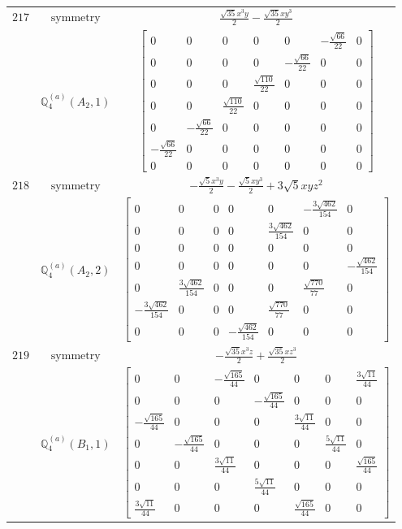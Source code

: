 \documentclass[fleqn,8pt,landscape]{jsarticle}
\begin{document}
\begin{longtable}{ccc}
$ 217 $ & $ \text{symmetry} $ & $ \frac{\sqrt{35} x^{3} y}{2} - \frac{\sqrt{35} x y^{3}}{2} $ \\
$  $ & $ \mathbb{Q}_{4}^{(a)}(A_{2},1) $ & $ \begin{bmatrix} 0 & 0 & 0 & 0 & 0 & - \frac{\sqrt{66}}{22} & 0 \\ 0 & 0 & 0 & 0 & - \frac{\sqrt{66}}{22} & 0 & 0 \\ 0 & 0 & 0 & \frac{\sqrt{110}}{22} & 0 & 0 & 0 \\ 0 & 0 & \frac{\sqrt{110}}{22} & 0 & 0 & 0 & 0 \\ 0 & - \frac{\sqrt{66}}{22} & 0 & 0 & 0 & 0 & 0 \\ - \frac{\sqrt{66}}{22} & 0 & 0 & 0 & 0 & 0 & 0 \\ 0 & 0 & 0 & 0 & 0 & 0 & 0 \end{bmatrix} $ \\ \hline
$ 218 $ & $ \text{symmetry} $ & $ - \frac{\sqrt{5} x^{3} y}{2} - \frac{\sqrt{5} x y^{3}}{2} + 3 \sqrt{5} x y z^{2} $ \\
$  $ & $ \mathbb{Q}_{4}^{(a)}(A_{2},2) $ & $ \begin{bmatrix} 0 & 0 & 0 & 0 & 0 & - \frac{3 \sqrt{462}}{154} & 0 \\ 0 & 0 & 0 & 0 & \frac{3 \sqrt{462}}{154} & 0 & 0 \\ 0 & 0 & 0 & 0 & 0 & 0 & 0 \\ 0 & 0 & 0 & 0 & 0 & 0 & - \frac{\sqrt{462}}{154} \\ 0 & \frac{3 \sqrt{462}}{154} & 0 & 0 & 0 & \frac{\sqrt{770}}{77} & 0 \\ - \frac{3 \sqrt{462}}{154} & 0 & 0 & 0 & \frac{\sqrt{770}}{77} & 0 & 0 \\ 0 & 0 & 0 & - \frac{\sqrt{462}}{154} & 0 & 0 & 0 \end{bmatrix} $ \\ \hline
$ 219 $ & $ \text{symmetry} $ & $ - \frac{\sqrt{35} x^{3} z}{2} + \frac{\sqrt{35} x z^{3}}{2} $ \\
$  $ & $ \mathbb{Q}_{4}^{(a)}(B_{1},1) $ & $ \begin{bmatrix} 0 & 0 & - \frac{\sqrt{165}}{44} & 0 & 0 & 0 & \frac{3 \sqrt{11}}{44} \\ 0 & 0 & 0 & - \frac{\sqrt{165}}{44} & 0 & 0 & 0 \\ - \frac{\sqrt{165}}{44} & 0 & 0 & 0 & \frac{3 \sqrt{11}}{44} & 0 & 0 \\ 0 & - \frac{\sqrt{165}}{44} & 0 & 0 & 0 & \frac{5 \sqrt{11}}{44} & 0 \\ 0 & 0 & \frac{3 \sqrt{11}}{44} & 0 & 0 & 0 & \frac{\sqrt{165}}{44} \\ 0 & 0 & 0 & \frac{5 \sqrt{11}}{44} & 0 & 0 & 0 \\ \frac{3 \sqrt{11}}{44} & 0 & 0 & 0 & \frac{\sqrt{165}}{44} & 0 & 0 \end{bmatrix} $ \\ \hline

\end{longtable}
\end{document}
